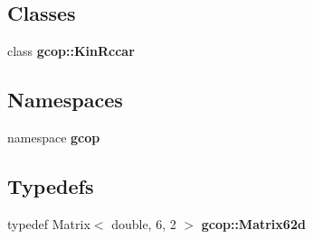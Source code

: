 \subsection*{\-Classes}
\begin{DoxyCompactItemize}
\item 
class {\bf gcop\-::\-Kin\-Rccar}
\end{DoxyCompactItemize}
\subsection*{\-Namespaces}
\begin{DoxyCompactItemize}
\item 
namespace {\bf gcop}
\end{DoxyCompactItemize}
\subsection*{\-Typedefs}
\begin{DoxyCompactItemize}
\item 
typedef \-Matrix$<$ double, 6, 2 $>$ {\bf gcop\-::\-Matrix62d}
\end{DoxyCompactItemize}
